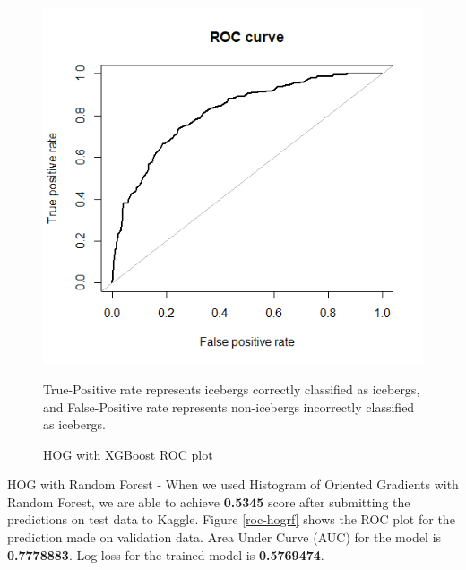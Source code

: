 \documentclass[fleqn,10pt]{SelfArx} %
\begin{document}
\begin{figure}
	\centering
	\includegraphics[width=0.9\linewidth]{iceberg/xgboost.png}
	\caption{HOG with XGBoost ROC plot}\label{roc-hogxg}
	\small
	True-Positive rate represents icebergs correctly classified as icebergs, and False-Positive rate represents non-icebergs incorrectly classified as icebergs.
\end{figure}

HOG with Random Forest - When we used Histogram of Oriented Gradients with Random Forest, we are able to achieve \textbf{0.5345} score after submitting the predictions on test data to Kaggle. Figure \ref{roc-hogrf} shows the ROC plot for the prediction made on validation data. Area Under Curve (AUC) for the model is \textbf{0.7778883}. Log-loss for the trained model is \textbf{0.5769474}.\\
\end{document}
